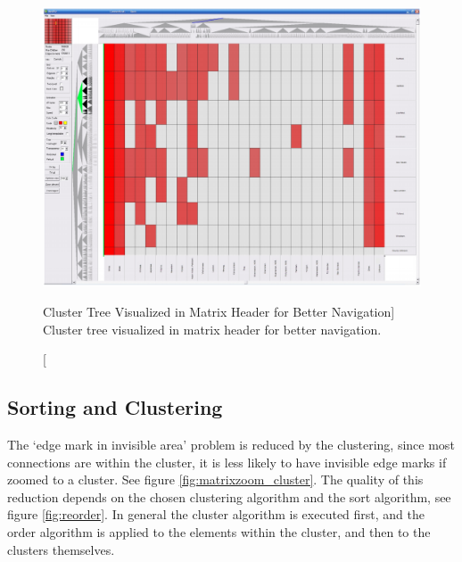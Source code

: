 \begin{figure}[h]
\centering
\includegraphics[width=\textwidth]{images/matrixzoom_abello}
\caption
  [Cluster Tree Visualized in Matrix Header for Better Navigation]
  {Cluster tree visualized in matrix header for better navigation.}
  \label{fig:matrixzoom_abello}
\end{figure}





\subsection{Sorting and Clustering}   

The ‘edge mark in invisible area' problem is reduced by the clustering, since most connections are within the cluster, it is less likely to have invisible edge marks if zoomed to a cluster. See figure \ref{fig:matrixzoom_cluster}. 
The quality of this reduction depends on the chosen clustering algorithm and the sort algorithm, see figure \ref{fig:reorder}. In general the cluster algorithm is executed first, and the order algorithm is applied to the elements within the cluster, and then to the clusters themselves.

